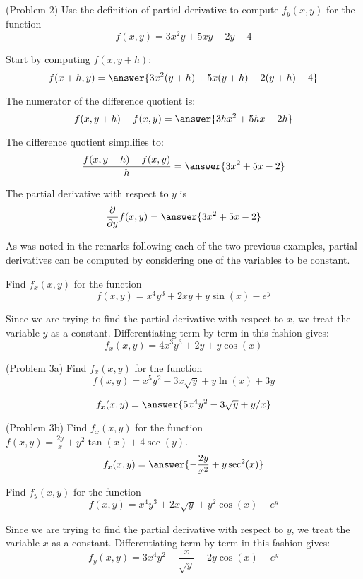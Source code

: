 \documentclass[handout]{ximera}
\begin{document}
\begin{problem}(Problem 2)
Use the definition of partial derivative to compute $f_y(x,y)$ for the function
\[
f(x,y) = 3x^2y + 5xy - 2y - 4
\]

Start by computing $f(x, y+h)$:
\[
f(x+h, y) = \answer{3x^2(y+h) + 5x(y+h) - 2(y+h) - 4}
\]

The numerator of the difference quotient is:
\[
f(x,y+h) - f(x,y) = \answer{3hx^2 + 5hx - 2h}
\]

The difference quotient simplifies to:
\[
\frac{f(x,y+h) - f(x,y)}{h} = \answer{3x^2 + 5x -2}
\]

The partial derivative with respect to $y$ is
\[
\frac{\partial}{\partial y} f(x,y) = \answer{3x^2 + 5x -2}
\]
\end{problem}

As was noted in the remarks following each of the two previous examples, partial derivatives can be computed by considering one of the variables to be constant.

\begin{example}[Example 3]
Find $f_x(x,y)$ for the function 
\[
f(x,y) = x^4y^3 + 2xy + y\sin(x) - e^y
\]

Since we are trying to find the partial derivative with respect to $x$, we treat the variable $y$ as a constant.
Differentiating term by term in this fashion gives:
\[
f_x(x,y) = 4x^3y^3 + 2y + y\cos(x)
\]
\end{example}

\begin{problem}(Problem 3a)
Find $f_x(x,y)$ for the function 
\[
f(x,y) = x^5y^2 - 3x\sqrt y + y\ln(x) + 3y
\]

\[
f_x(x,y) = \answer{5x^4y^2 - 3\sqrt y + y/x}
\]
\end{problem}

\begin{problem}(Problem 3b)
Find $f_x(x,y)$ for the function $f(x,y) = \frac{2y}{x} + y^2\tan(x) + 4\sec(y)$.\\
\[
f_x(x,y) = \answer{-\frac{2y}{x^2} + y\sec^2(x)}
\]
\end{problem}


\begin{example}[Example 4]
Find $f_y(x,y)$ for the function 
\[
f(x,y) = x^4y^3 + 2x\sqrt{y} + y^2\cos(x) - e^y
\]

Since we are trying to find the partial derivative with respect to $y$, we treat the variable $x$ as a constant.
Differentiating term by term in this fashion gives:
\[
f_y(x,y) = 3x^4y^2 + \frac{x}{\sqrt{y}} + 2y\cos(x) - e^y
\]
\end{example}
\end{document}
